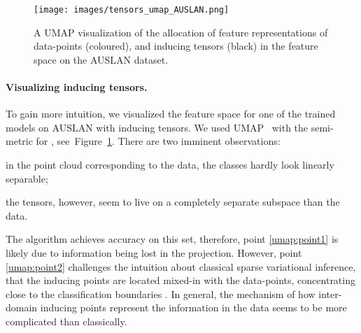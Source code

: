 \documentclass{article}
\begin{document}
\begin{figure}[t]
	\centering
	\begin{minipage}{0.55\textwidth}
        \hspace{-40pt}
        \centering
		\texttt{[image: images/tensors\_umap\_AUSLAN.png]}
\end{minipage} \hspace{-5pt}
	\vspace{-10pt}
	\caption{A UMAP visualization of the allocation of feature representations of data-points (coloured), and inducing tensors (black) in the feature space on the AUSLAN dataset.}
\label{fig:tens_umap}
	\vspace{-10pt}
\end{figure}

\paragraph{Visualizing inducing tensors.}
To gain more intuition, we visualized the feature space for one of the trained models on AUSLAN with  inducing tensors.
We used UMAP~\cite{mcinnes2018umap-software} with the semi-metric  for , see~Figure~\ref{fig:tens_umap}.
There are two imminent observations: \begin{enumerate*}[label=(\roman*)] \item in the point cloud corresponding to the data, the classes hardly look linearly separable; \label{umap:point1} \item the tensors, however, seem to live on a completely separate subspace than the data\label{umap:point2}.\end{enumerate*} 
The algorithm achieves  accuracy on this set, therefore, point \ref{umap:point1} is likely due to information being lost in the projection. 
However, point \ref{umap:point2} challenges the intuition about classical sparse variational inference, that the inducing points are located mixed-in with the data-points, concentrating close to the classification boundaries \cite{Hensman2015Scalable}.
In general, the mechanism of how inter-domain inducing points represent the information in the data seems to be more complicated than classically.
\end{document}
